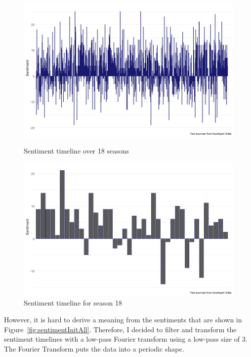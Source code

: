 \documentclass[10pt,a4paper]{article}
\begin{document}
	\begin{figure}[!h]
  \centering
  \begin{minipage}[b]{0.45\textwidth}
    \includegraphics[width=\textwidth]{images/sentimentInitAll.png}
    \caption{Sentiment timeline over 18 seasons}
	\label{fig:sentimentInitAll}
  \end{minipage}
  \hfill
  \begin{minipage}[b]{0.5\textwidth}
    \includegraphics[width=\textwidth]{images/sentimentInit18.png}
    \caption{Sentiment timeline for season 18}
	\label{fig:sentimentInit18}
  \end{minipage}
\end{figure}

However, it is hard to derive a meaning from the sentiments that are shown in Figure~\ref{fig:sentimentInitAll}. Therefore, I decided to filter and transform the sentiment timelines with a low-pass Fourier transform using a low-pass size of 3. The Fourier Transform puts the data into a periodic shape.
		
\end{document}

